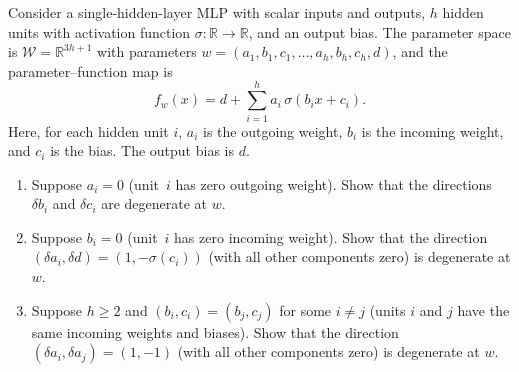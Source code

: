\documentclass[11pt]{article}
\newcommand{\R}{\mathbb{R}}
\newcommand{\W}{\mathcal{W}}
\begin{document}
\begin{exercise}
\label{ex:mlp-degeneracy}
    Consider a single-hidden-layer MLP with scalar inputs and outputs, $h$
    hidden units with activation function $\sigma : \R \to \R$, and an output
    bias.
    The parameter space is $\W = \R^{3h+1}$ with parameters
    $w = (a_1, b_1, c_1, \ldots, a_h, b_h, c_h, d)$, and the
    parameter--function map is
    \begin{equation*}
        f_w(x) = d + \sum_{i=1}^{h} a_i \, \sigma(b_i x + c_i).
    \end{equation*}
    Here, for each hidden unit $i$, $a_i$ is the outgoing weight, $b_i$ is the
    incoming weight, and $c_i$ is the bias. The output bias is $d$.
\begin{enumerate}
    \item
        Suppose $a_i = 0$ (unit~$i$ has zero outgoing weight).
        Show that the directions $\delta b_i$ and $\delta c_i$ are degenerate
        at $w$.
    \item
        Suppose $b_i = 0$ (unit~$i$ has zero incoming weight).
        Show that the direction
            $(\delta a_i, \delta d) = (1, -\sigma(c_i))$
        (with all other components zero) is degenerate at $w$.
    \item
        Suppose $h \geq 2$ and $(b_i, c_i) = (b_j, c_j)$ for some $i \neq j$
        (units $i$ and $j$ have the same incoming weights and biases).
        Show that the direction $(\delta a_i, \delta a_j) = (1, -1)$
        (with all other components zero) is degenerate at $w$.
\end{enumerate}
\end{exercise}
\end{document}

